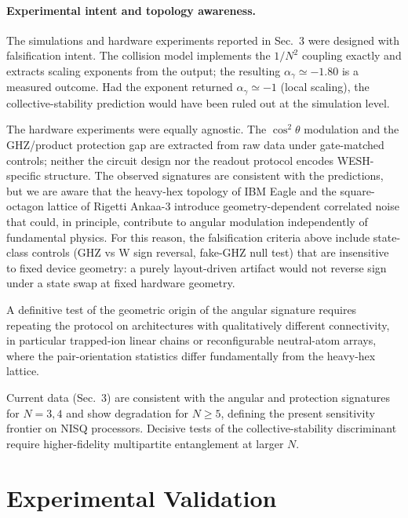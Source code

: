 \documentclass[12pt,a4paper]{article}
\numberwithin{equation}{section}
\begin{document}
\paragraph{Experimental intent and topology awareness.}
The simulations and hardware experiments reported in Sec.~3 were designed with falsification intent. The collision model implements the $1/N^2$ coupling exactly and extracts scaling exponents from the output; the resulting $\alpha_\gamma \simeq -1.80$ is a measured outcome. Had the exponent returned $\alpha_\gamma \simeq -1$ (local scaling), the collective-stability prediction would have been ruled out at the simulation level.

The hardware experiments were equally agnostic. The $\cos^2\theta$ modulation and the GHZ/product protection gap are extracted from raw data under gate-matched controls; neither the circuit design nor the readout protocol encodes WESH-specific structure. The observed signatures are consistent with the predictions, but we are aware that the heavy-hex topology of IBM Eagle and the square-octagon lattice of Rigetti Ankaa-3 introduce geometry-dependent correlated noise that could, in principle, contribute to angular modulation independently of fundamental physics. For this reason, the falsification criteria above include state-class controls (GHZ vs W sign reversal, fake-GHZ null test) that are insensitive to fixed device geometry: a purely layout-driven artifact would not reverse sign under a state swap at fixed hardware geometry.

A definitive test of the geometric origin of the angular signature requires repeating the protocol on architectures with qualitatively different connectivity, in particular trapped-ion linear chains or reconfigurable neutral-atom arrays, where the pair-orientation statistics differ fundamentally from the heavy-hex lattice.

\noindent Current data (Sec.~3) are consistent with the angular and protection signatures for $N=3,4$ and show
degradation for $N\ge 5$, defining the present sensitivity frontier on NISQ processors. Decisive tests of the
collective-stability discriminant require higher-fidelity multipartite entanglement at larger $N$.
\vspace{0.8cm}

\section{Experimental Validation}  
\label{sec:experimental}
\setcounter{figure}{0}
\renewcommand{\thefigure}{3.\arabic{figure}}
\end{document}
